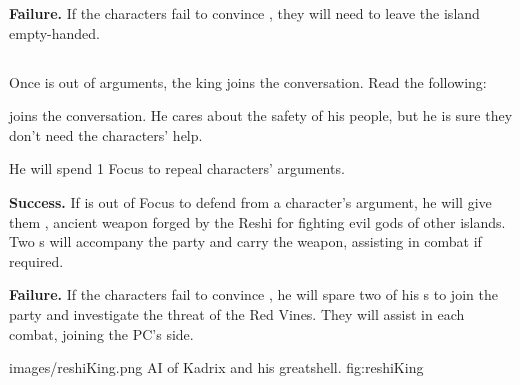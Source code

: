 \textbf{Failure.} If the characters fail to convince \npcReshiInterpreter{}, they will need to leave the island empty-handed.


\subsection{\npcReshiKing{}}
\label{ssec:reshiKing}

Once \npcReshiInterpreter{} is out of arguments, the king joins the conversation. Read the following:


\npcReshiKing[s] joins the conversation.
He cares about the safety of his people, but he is sure they don't need the characters' help.

He will spend 1 Focus to repeal characters' arguments.


\textbf{Success.} If \npcReshiKing{} is out of Focus to defend from a character's argument, he will give them \lootSprenDagger{}, ancient weapon forged by the Reshi for fighting evil gods of other islands. Two \enemyReshiWarrior{}s will accompany the party and carry the weapon, assisting in combat if required.

\textbf{Failure.} If the characters fail to convince \npcReshiKing{}, he will spare two of his \enemyReshiWarrior{}s to join the party and investigate the threat of the Red Vines. They will assist in each combat, joining the PC's side.

					{images/reshiKing.png}
					{AI}
					{\npcReshiKing{} of Kadrix and his greatshell.}
					{fig:reshiKing}
